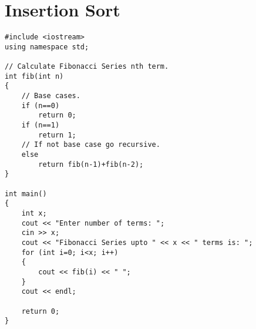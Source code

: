 \documentclass[12pt,a4paper]{article}
\begin{document}
\section{Insertion Sort}
\begin{lstlisting}[caption={Fibonacci Series},escapechar=$]
#include <iostream>
using namespace std;

// Calculate Fibonacci Series nth term.
int fib(int n)
{
	// Base cases.
	if (n==0)
		return 0;
	if (n==1)
		return 1;
	// If not base case go recursive.
	else
		return fib(n-1)+fib(n-2);
}

int main()
{
	int x;
	cout << "Enter number of terms: ";
	cin >> x;
	cout << "Fibonacci Series upto " << x << " terms is: ";
	for (int i=0; i<x; i++)
	{
		cout << fib(i) << " ";
	}
	cout << endl;

	return 0;
}
\end{lstlisting}
\end{document}
